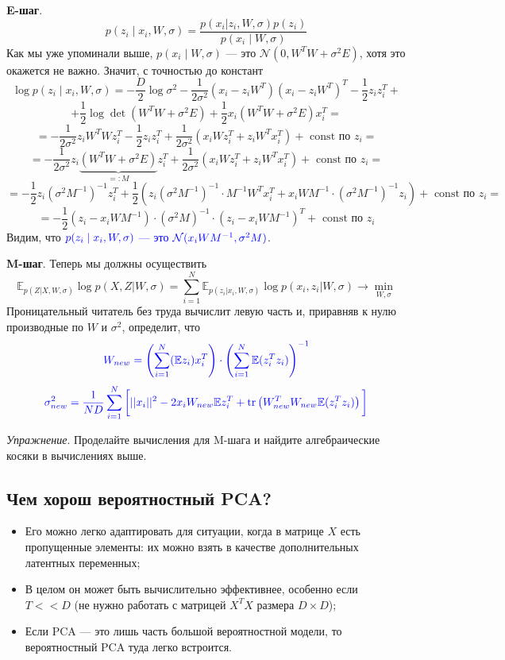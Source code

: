 \documentclass{amsart}
\theoremstyle{definition}
\theoremstyle{remark}
\numberwithin{equation}{section}
\begin{document}
\textbf{E-шаг}.
$$p(z_i\mid x_i, W, \sigma) = \frac{p(x_i|z_i, W, \sigma)p(z_i)}{p(x_i\mid W,\sigma)}$$
Как мы уже упоминали выше, $p(x_i\mid W,\sigma)$ --- это $\mathcal{N}(0, W^TW + \sigma^2E)$, хотя это окажется не важно. Значит, с точностью до констант
$$\log{p(z_i\mid x_i, W, \sigma)} = -\frac{D}2\log{\sigma^2}-\frac1{2\sigma^2}(x_i - z_iW^T)(x_i - z_iW^T)^T - \frac12z_iz_i^T + $$
$$+ \frac12\log{\det(W^TW + \sigma^2E)} + \frac12x_i(W^TW + \sigma^2E)x_i^T =$$
$$= -\frac{1}{2\sigma^2}z_iW^TWz_i^T - \frac12z_iz_i^T + \frac1{2\sigma^2}(x_iWz_i^T + z_iW^Tx_i^T)  + \mbox{ const по $z_i$} =$$
$$=-\frac1{2\sigma^2}z_i\underbrace{(W^TW + \sigma^2E)}_{=:M}z_i^T+ \frac1{2\sigma^2}(x_iWz_i^T + z_iW^Tx_i^T)  + \mbox{ const по $z_i$} =$$
$$=-\frac12z_i(\sigma^2M^{-1})^{-1}z_i^T + \frac12\left(z_i (\sigma^2M^{-1})^{-1}\cdot M^{-1} W^Tx_i^T + x_iWM^{-1}\cdot(\sigma^2M^{-1})^{-1}z_i\right) + \mbox{ const по $z_i$} =$$
$$=-\frac12\left(z_i - x_iWM^{-1}\right)\cdot(\sigma^2M)^{-1}\cdot\left(z_i - x_iWM^{-1}\right)^T + \mbox{ const по $z_i$}$$
Видим, что \textcolor{blue}{$\textcolor{blue}{p(z_i\mid x_i, W, \sigma)}$ --- это $\textcolor{blue}{\mathcal{N}(x_iWM^{-1}, \sigma^2M)}$}.

\medskip

\textbf{M-шаг}. Теперь мы должны осуществить
$$\mathbb{E}_{p(Z|X, W,\sigma)}\log{p(X, Z|W,\sigma)} = \sum_{i=1}^N\mathbb{E}_{p(z_i|x_i, W,\sigma)}\log{p(x_i, z_i|W,\sigma)}\longrightarrow\min\limits_{W,\sigma}$$
Проницательный читатель без труда вычислит левую часть и, приравняв к нулю производные по $W$ и $\sigma^2$, определит, что
$$\textcolor{blue}{W_{new} = \left(\sum_{i=1}^N(\mathbb{E}z_i)x_i^T\right)\cdot\left(\sum_{i=1}^N\mathbb{E}(z_i^Tz_i)\right)^{-1}}$$
$$\textcolor{blue}{\sigma^2_{new} = \frac1{ND}\sum_{i=1}^N\left[||x_i||^2 - 2x_iW_{new}\mathbb{E}z_i^T + \mathrm{tr}\left(W_{new}^TW_{new}\mathbb{E}(z_i^Tz_i)\right)\vphantom{\begin{matrix}1\\2\end{matrix}}\right]}$$

\textit{Упражнение}. Проделайте вычисления для M-шага и найдите алгебраические косяки в вычислениях выше.

\subsection{Чем хорош вероятностный PCA?}
\begin{itemize}
\item Его можно легко адаптировать для ситуации, когда в матрице $X$ есть пропущенные элементы: их можно взять в качестве дополнительных латентных переменных;
\item В целом он может быть вычислительно эффективнее, особенно если $T << D$ (не нужно работать с матрицей $X^TX$ размера $D\times D$);
\item Если PCA --- это лишь часть большой вероятностной модели, то вероятностный PCA туда легко встроится.
\end{itemize}
\end{document}
